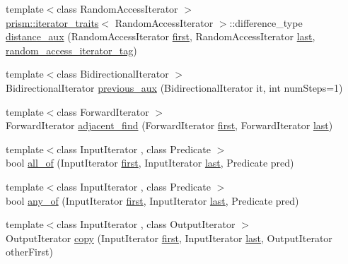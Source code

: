 \begin{DoxyCompactItemize}
\item 
{\footnotesize template$<$class Random\+Access\+Iterator $>$ }\\\hyperlink{structprism_1_1iterator__traits}{prism\+::iterator\+\_\+traits}$<$ Random\+Access\+Iterator $>$\+::difference\+\_\+type \hyperlink{namespaceprism_a3b40eca07d5c5dca59a232562628a001}{distance\+\_\+aux} (Random\+Access\+Iterator \hyperlink{namespaceprism_ae3fb7a1926a9e8e59300cd5e370470da}{first}, Random\+Access\+Iterator \hyperlink{namespaceprism_abe4956c4e865f55ca126b7fb973b5078}{last}, \hyperlink{structprism_1_1random__access__iterator__tag}{random\+\_\+access\+\_\+iterator\+\_\+tag})
\item 
{\footnotesize template$<$class Bidirectional\+Iterator $>$ }\\Bidirectional\+Iterator \hyperlink{namespaceprism_adc2f50ca26ef33527adf172e1f999bbc}{previous\+\_\+aux} (Bidirectional\+Iterator it, int num\+Steps=1)
\item 
{\footnotesize template$<$class Forward\+Iterator $>$ }\\Forward\+Iterator \hyperlink{namespaceprism_a82052418345794a13044c15d8e32dd89}{adjacent\+\_\+find} (Forward\+Iterator \hyperlink{namespaceprism_ae3fb7a1926a9e8e59300cd5e370470da}{first}, Forward\+Iterator \hyperlink{namespaceprism_abe4956c4e865f55ca126b7fb973b5078}{last})
\item 
{\footnotesize template$<$class Input\+Iterator , class Predicate $>$ }\\bool \hyperlink{namespaceprism_aba366b328f3b6161e6115c16b7153c6d}{all\+\_\+of} (Input\+Iterator \hyperlink{namespaceprism_ae3fb7a1926a9e8e59300cd5e370470da}{first}, Input\+Iterator \hyperlink{namespaceprism_abe4956c4e865f55ca126b7fb973b5078}{last}, Predicate pred)
\item 
{\footnotesize template$<$class Input\+Iterator , class Predicate $>$ }\\bool \hyperlink{namespaceprism_a5d0e3ddb9f698759635572f1220ec0ca}{any\+\_\+of} (Input\+Iterator \hyperlink{namespaceprism_ae3fb7a1926a9e8e59300cd5e370470da}{first}, Input\+Iterator \hyperlink{namespaceprism_abe4956c4e865f55ca126b7fb973b5078}{last}, Predicate pred)
\item 
{\footnotesize template$<$class Input\+Iterator , class Output\+Iterator $>$ }\\Output\+Iterator \hyperlink{namespaceprism_ae776f4cd825f79e7af1cf6ee1d90a209}{copy} (Input\+Iterator \hyperlink{namespaceprism_ae3fb7a1926a9e8e59300cd5e370470da}{first}, Input\+Iterator \hyperlink{namespaceprism_abe4956c4e865f55ca126b7fb973b5078}{last}, Output\+Iterator other\+First)

\end{DoxyCompactItemize}

